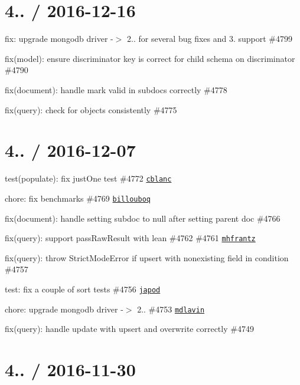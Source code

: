 \section*{4.. / 2016-\/12-\/16 }


\begin{DoxyItemize}
\item fix\+: upgrade mongodb driver -\/$>$ 2.. for several bug fixes and 3. support \#4799
\item fix(model)\+: ensure discriminator key is correct for child schema on discriminator \#4790
\item fix(document)\+: handle mark valid in subdocs correctly \#4778
\item fix(query)\+: check for objects consistently \#4775
\end{DoxyItemize}

\section*{4.. / 2016-\/12-\/07 }


\begin{DoxyItemize}
\item test(populate)\+: fix just\+One test \#4772 \href{https://github.com/cblanc}{\tt cblanc}
\item chore\+: fix benchmarks \#4769 \href{https://github.com/billouboq}{\tt billouboq}
\item fix(document)\+: handle setting subdoc to null after setting parent doc \#4766
\item fix(query)\+: support pass\+Raw\+Result with lean \#4762 \#4761 \href{https://github.com/mhfrantz}{\tt mhfrantz}
\item fix(query)\+: throw Strict\+Mode\+Error if upsert with nonexisting field in condition \#4757
\item test\+: fix a couple of sort tests \#4756 \href{https://github.com/japod}{\tt japod}
\item chore\+: upgrade mongodb driver -\/$>$ 2.. \#4753 \href{https://github.com/mdlavin}{\tt mdlavin}
\item fix(query)\+: handle update with upsert and overwrite correctly \#4749
\end{DoxyItemize}

\section*{4.. / 2016-\/11-\/30 }


